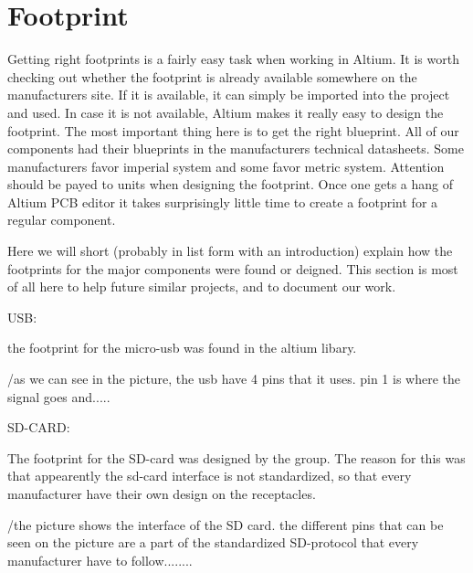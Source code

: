 \section {Footprint}

Getting right footprints is a fairly easy task when working in Altium.
It is worth checking out whether the footprint is already available somewhere on the manufacturers site.
If it is available, it can simply be imported into the project and used.
In case it is not available, Altium makes it really easy to design the footprint.
The most important thing here is to get the right blueprint.
All of our components had their blueprints in the manufacturers technical datasheets.
Some manufacturers favor imperial system and some favor metric system.
Attention should be payed to units when designing the footprint.
Once one gets a hang of Altium PCB editor it takes surprisingly little time to create a footprint for a regular component.


Here we will short (probably in list form with an introduction) explain how the footprints for the major components were found or deigned.
This section is most of all here to help future similar projects, and to document our work.

USB:

the footprint for the micro-usb was found in the altium libary. 


/as we can see in the picture, the usb have 4 pins that it uses. pin 1 is where the signal goes and.....

SD-CARD:

The footprint for the SD-card was designed by the group. The reason for this was that appearently the sd-card interface is not standardized, so that 
every manufacturer have their own design on the receptacles. 


/the picture shows the interface of the SD card. the different pins that can be seen on the picture are a part of the standardized SD-protocol that 
every manufacturer have to follow........
